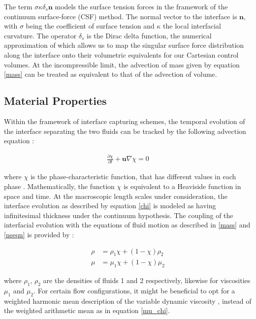 The term $\sigma \kappa \delta_{s}\boldsymbol{n}$ models the surface tension forces in the 
framework of the continuum surface-force (CSF) method. The normal vector to the interface 
is $\boldsymbol{n}$, with $\sigma$ being the coefficient of surface tension and $\kappa$ the 
local interfacial curvature. The operator $\delta_{s}$ is the Dirac delta function, 
the numerical approximation of which allows us to map the singular surface force distribution
along the interface onto their volumetric equivalents for our Cartesian control volumes. 
At the incompressible limit, the advection of mass given by equation \ref{mass} can be 
treated as equivalent to that of the advection of volume.


\subsection*{Material Properties}
Within the framework of interface capturing schemes, the 
temporal evolution of the interface separating the two fluids
can be tracked by the following advection equation : 

\begin{align} 
	\frac{\partial \chi}{\partial t} + \boldsymbol{u}\nabla\chi = 0 	
\label{chi}
\end{align}

where $\chi$ is the phase-characteristic function, that has different values 
in each phase  . Mathematically, the function $\chi$
is equivalent to a Heaviside function in space and time. 
At the macroscopic length scales under consideration, the interface evolution
as described by equation \ref{chi} is modeled as having infinitesimal thickness
under the continuum hypothesis. The coupling of the interfacial evolution with
the equations of fluid motion as described in \ref{mass} and \ref{nseqn} is provided by :  

\begin{align}
	\rho &= \rho_{1}\chi + \left(1 - \chi\right)\rho_{2} \label {rho_chi} \\ 
	\mu  &= \mu_{1}\chi  + \left(1 - \chi\right)\mu_{2}  
  \label{mu_chi}
\end{align}

where $\rho_{1}$, $\rho_{2}$ are the densities of fluids 1 and 2 respectively, 
likewise for viscosities $\mu_{1}$ and $\mu_{2}$. For certain flow configurations, 
it might be beneficial to opt for a weighted harmonic mean description of the 
variable dynamic viscosity , instead of the weighted arithmetic mean as in equation \ref{mu_chi}. 


